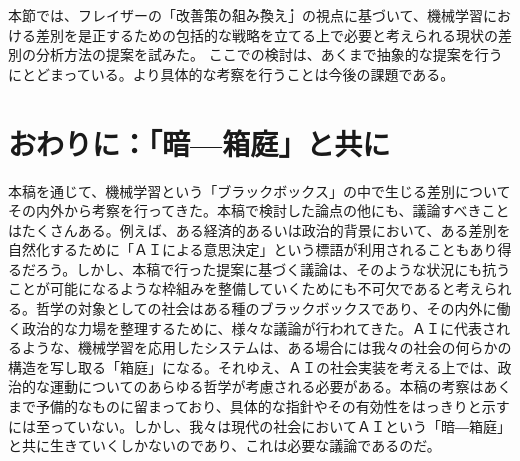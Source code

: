 \documentclass[b5j,twoside,twocolumn]{utarticle}
\newcommand{\mysection}[1]{\vspace{-5mm}\section{#1}\vspace{-2mm}}
\begin{document}
本節では、フレイザーの「\.改\.善\.策\.の\.組\.み\.換\.え」の視点に基づいて、機械学習における差別を是正するための包括的な戦略を立てる上で必要と考えられる現状の差別の分析方法の提案を試みた。
ここでの検討は、あくまで抽象的な提案を行うにとどまっている。より具体的な考察を行うことは今後の課題である。











\mysection{\tbaselineshift=3.0pt おわりに：「暗---箱庭」と共に}
本稿を通じて、機械学習という「ブラックボックス」の中で生じる差別についてその内外から考察を行ってきた。本稿で検討した論点の他にも、議論すべきことはたくさんある。例えば、ある経済的あるいは政治的背景において、ある差別を自然化するために「ＡＩによる意思決定」という標語が利用されることもあり得るだろう。しかし、本稿で行った提案に基づく議論は、そのような状況にも抗うことが可能になるような枠組みを整備していくためにも不可欠であると考えられる。哲学の対象としての社会はある種のブラックボックスであり、その内外に働く政治的な力場を整理するために、様々な議論が行われてきた。ＡＩに代表されるような、機械学習を応用したシステムは、ある場合には我々の社会の何らかの構造を写し取る「箱庭」になる。それゆえ、ＡＩの社会実装を考える上では、政治的な運動についてのあらゆる哲学が考慮される必要がある。本稿の考察はあくまで予備的なものに留まっており、具体的な指針やその有効性をはっきりと示すには至っていない。しかし、我々は現代の社会においてＡＩという「暗―箱庭」と共に生きていくしかないのであり、これは必要な議論であるのだ。
\end{document}
